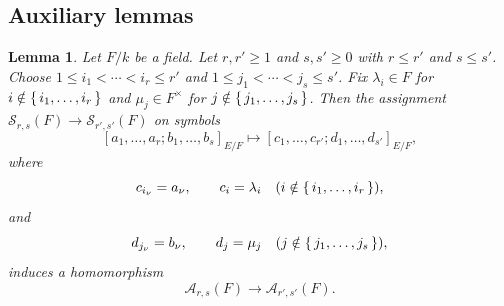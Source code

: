 \documentclass[a4paper,12pt,reqno]{amsart}
\numberwithin{equation}{section}
\newtheorem{lem}[lem]{Lemma}
\theoremstyle{definition}
\newcommand{\Acal}{\mathcal{A}}
\begin{document}
\subsection{Auxiliary lemmas}


\begin{lem}\label{lem:fixed-insertion}
Let $F/k$ be a field.  Let $r,r'\geq1$ and $s,s'\geq0$ with
$r\leq r'$ and $s\leq s'$.  Choose 
$1\leq i_1<\cdots<i_r\leq r'$
and 
$1\leq j_1<\cdots<j_s\leq s'$.
Fix $\lambda_i\in F$ for $i\notin\set{i_1,\ldots,i_r}$ and
$\mu_j\in F^\times$ for $j\notin\set{j_1,\ldots,j_s}$.
Then the assignment 
$\mathcal S_{r,s}(F) \to \mathcal S_{r',s'}(F)$
on symbols
\begin{equation}\label{eq:fixed-insertion}
 [a_1,\ldots,a_r;b_1,\ldots,b_s]_{E/F}
 \mapsto
 [c_1,\ldots,c_{r'};d_1,\ldots,d_{s'}]_{E/F},
\end{equation}
where
\[
 c_{i_\nu}=a_\nu,\qquad
 c_i=\lambda_i\quad(i\notin\set{i_1,\ldots,i_r}),
\]
and
\[
 d_{j_\nu}=b_\nu,\qquad
 d_j=\mu_j\quad(j\notin\set{j_1,\ldots,j_s}),
\]
induces a homomorphism
\[
 \Acal_{r,s}(F)\to\Acal_{r',s'}(F).
\]
\end{lem}
\end{document}
